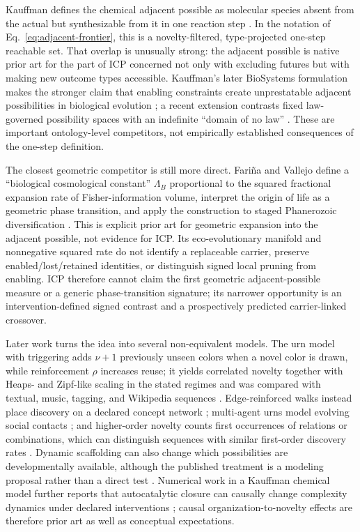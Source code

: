 Kauffman defines the chemical adjacent possible as molecular species absent
from the actual but synthesizable from it in one reaction step
\citep[p.~142]{Kauffman2000Investigations}. In the notation of
Eq.~\eqref{eq:adjacent-frontier}, this is a novelty-filtered, type-projected
one-step reachable set. That overlap is unusually strong: the adjacent possible
is native prior art for the part of ICP concerned not only with excluding
futures but with making new outcome types accessible.
Kauffman's later BioSystems formulation makes the stronger claim that enabling
constraints create unprestatable adjacent possibilities in biological
evolution \citep{Kauffman2014Prolegomenon}; a recent extension contrasts fixed
law-governed possibility spaces with an indefinite ``domain of no law''
\citep{PatraKauffman2025NoLaw}. These are important ontology-level competitors,
not empirically established consequences of the one-step definition.

The closest geometric competitor is still more direct. Fari\~na and Vallejo
define a ``biological cosmological constant'' $\Lambda_B$ proportional to the
squared fractional expansion rate of Fisher-information volume, interpret the
origin of life as a geometric phase transition, and apply the construction to
staged Phanerozoic diversification \citep{FarinaVallejo2026LambdaB}. This is
explicit prior art for geometric expansion into the adjacent possible, not
evidence for ICP. Its eco-evolutionary manifold and nonnegative squared rate do
not identify a replaceable carrier, preserve enabled/lost/retained identities,
or distinguish signed local pruning from enabling. ICP therefore cannot claim
the first geometric adjacent-possible measure or a generic phase-transition
signature; its narrower opportunity is an intervention-defined signed contrast
and a prospectively predicted carrier-linked crossover.

Later work turns the idea into several non-equivalent models. The urn model
with triggering adds $\nu+1$ previously unseen colors when a novel color is
drawn, while reinforcement $\rho$ increases reuse; it yields correlated
novelty together with Heaps- and Zipf-like scaling in the stated regimes and
was compared with textual, music, tagging, and Wikipedia sequences
\citep{TriaEtAl2014Novelties}. Edge-reinforced walks instead place discovery on
a declared concept network \citep{IacopiniEtAl2018Innovation}; multi-agent urns
model evolving social contacts \citep{UbaldiEtAl2021SocialNetworks}; and
higher-order novelty counts first occurrences of relations or combinations,
which can distinguish sequences with similar first-order discovery rates
\citep{DiBonaEtAl2025HigherOrder}. Dynamic scaffolding can also change which
possibilities are developmentally available, although the published treatment
is a modeling proposal rather than a direct test
\citep{Griesemer2024Scaffolded}. Numerical work in a Kauffman chemical model
further reports that autocatalytic closure can causally change complexity
dynamics under declared interventions \citep{Faggian2025Closure}; causal
organization-to-novelty effects are therefore prior art as well as conceptual
expectations.

